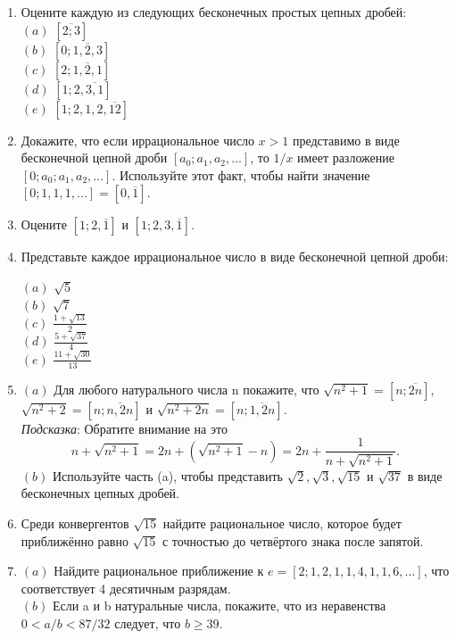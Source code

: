 \documentclass[11pt]{article}
\begin{document}
\begin{enumerate}
	
\item Оцените каждую из следующих бесконечных простых цепных дробей:
\\
$(a)$ $[\overline{2;3}]$
\\
$(b)$  $[0;\overline{1,2,3}]$
\\
$(c)$  $[2;\overline{1,2,1}]$ 
\\
$(d)$  $[1;2,\overline{3,1}]$
\\
$(e)$  $[1;2,1,2,\overline{12}]$

\item Докажите, что если иррациональное число $x>1$ представимо в виде бесконечной цепной дроби $[a_0;a_1,a_2,...]$, то $1/x$ имеет разложение $[0;a_0;a_1,a_2,...]$. Используйте этот факт, чтобы найти значение $[0;1,1,1,...]=[0,\overline{1}]$.

\item Оцените $[1;2,\overline{1}]$ и $[1;2,3,\overline{1}]$.

\item Представьте каждое иррациональное число в виде бесконечной цепной дроби:
				
$(a)$ $\sqrt{5}$\\
$(b)$ $\sqrt{7}$\\
$(c)$ $\frac{1+\sqrt{13}}{2}$\\
$(d)$ $\frac{5+\sqrt{37}}{4}$\\
$(e)$ $\frac{11+\sqrt{30}}{13}$
				 
\item $(a)$ Для любого натурального числа n покажите, что $\sqrt{n^{2}+1}=[n;\overline{2n}]$, $\sqrt{n^{2}+2}=[n;\overline{n,2n}]$ и $\sqrt{n^{2}+2n}=[n;\overline{1,2n}]$.\\ \textit{Подсказка}: Обратите внимание на это $$ n+\sqrt{n^{2}+1}=2n+(\sqrt{n^{2}+1}-n)=2n+\frac{1}{n+\sqrt{n^{2}+1}} .  $$ 
$ (b) $ Используйте часть (a), чтобы представить $ \sqrt{2}, \sqrt{3}, \sqrt{15}$ и $\sqrt{37}$ в виде бесконечных цепных дробей.
			
\item Среди конвергентов $\sqrt{15}$ найдите рациональное число, которое будет приближённо равно $\sqrt{15}$ с точностью до четвёртого знака после запятой. 

\item $(a)$ Найдите рациональное приближение к $e=[2;1,2,1,1,4,1,1,6,...]$, что соответствует 4 десятичным разрядам.
\\$(b)$ Если a и b натуральные числа, покажите, что из неравенства $0<a/b<87/32$ следует, что $b\geq39$.


\end{enumerate}
\end{document}
